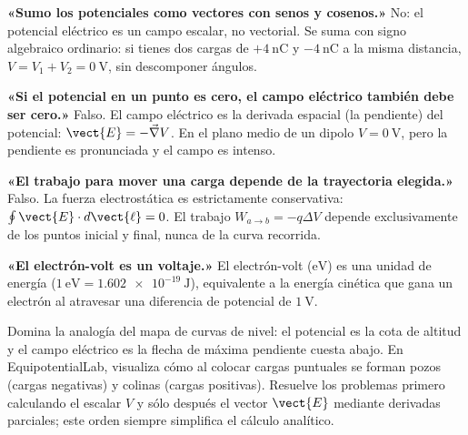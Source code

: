 \documentclass[11pt]{article}
\begin{document}
\begin{eError}\textbf{«Sumo los potenciales como vectores con senos y cosenos.»} No: el potencial eléctrico es un campo escalar, no vectorial. Se suma con signo algebraico ordinario: si tienes dos cargas de $+4\ \mathrm{nC}$ y $-4\ \mathrm{nC}$ a la misma distancia, $V=V_1+V_2=0\ \mathrm{V}$, sin descomponer ángulos.\end{eError}
\begin{eError}\textbf{«Si el potencial en un punto es cero, el campo eléctrico también debe ser cero.»} Falso. El campo eléctrico es la derivada espacial (la pendiente) del potencial: $\vect{E}=-\vec\nabla V$. En el plano medio de un dipolo $V=0\ \mathrm{V}$, pero la pendiente es pronunciada y el campo es intenso.\end{eError}
\begin{eError}\textbf{«El trabajo para mover una carga depende de la trayectoria elegida.»} Falso. La fuerza electrostática es estrictamente conservativa: $\oint \vect{E}\cdot d\vect{\ell}=0$. El trabajo $W_{a\to b}=-q\Delta V$ depende exclusivamente de los puntos inicial y final, nunca de la curva recorrida.\end{eError}
\begin{eError}\textbf{«El electrón-volt es un voltaje.»} El electrón-volt ($\mathrm{eV}$) es una unidad de energía ($1\ \mathrm{eV}=\SI{1,602e-19}{\joule}$), equivalente a la energía cinética que gana un electrón al atravesar una diferencia de potencial de $\SI{1}{\volt}$.\end{eError}

\begin{eConsejo}Domina la analogía del mapa de curvas de nivel: el potencial es la cota de altitud y el campo eléctrico es la flecha de máxima pendiente cuesta abajo. En EquipotentialLab, visualiza cómo al colocar cargas puntuales se forman pozos (cargas negativas) y colinas (cargas positivas). Resuelve los problemas primero calculando el escalar $V$ y sólo después el vector $\vect{E}$ mediante derivadas parciales; este orden siempre simplifica el cálculo analítico.\end{eConsejo}
\end{document}
